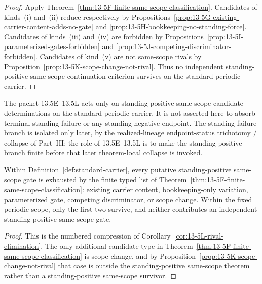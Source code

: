\begin{proof}
Apply Theorem~\ref{thm:13-5F-finite-same-scope-classification}. Candidates of kinds~(i) and~(ii)
reduce respectively by Propositions~\ref{prop:13-5G-existing-carrier-content-adds-no-gate} and
\ref{prop:13-5H-bookkeeping-no-standing-force}. Candidates of kinds~(iii) and~(iv) are forbidden by
Propositions~\ref{prop:13-5I-parameterized-gates-forbidden} and
\ref{prop:13-5J-competing-discriminator-forbidden}. Candidates of kind~(v) are not same-scope rivals
by Proposition~\ref{prop:13-5K-scope-change-not-rival}. Thus no independent standing-positive same-scope continuation
criterion survives on the standard periodic carrier.
\end{proof}

\begin{remark}\label{rem:13-5F-two-branch-posture}
The packet 13.5E--13.5L acts only on standing-positive same-scope candidate determinations on the standard periodic carrier. It is not asserted here to absorb terminal standing failure or any standing-negative endpoint. The standing-failure branch is isolated only later, by the realized-lineage endpoint-status trichotomy / collapse of Part~III; the role of 13.5E--13.5L is to make the standing-positive branch finite before that later theorem-local collapse is invoked.
\end{remark}

\begin{proposition}\label{prop:residual-gate-exhaustion}
Within Definition~\ref{def:standard-carrier}, every putative standing-positive same-scope gate is exhausted by the
finite typed list of Theorem~\ref{thm:13-5F-finite-same-scope-classification}: existing carrier
content, bookkeeping-only variation, parameterized gate, competing discriminator, or scope change.
Within the fixed periodic scope, only the first two survive, and neither contributes an independent
standing-positive same-scope gate.
\end{proposition}

\begin{proof}
This is the numbered compression of Corollary~\ref{cor:13-5L-rival-elimination}. The only additional
candidate type in Theorem~\ref{thm:13-5F-finite-same-scope-classification} is scope change, and by
Proposition~\ref{prop:13-5K-scope-change-not-rival} that case is outside the standing-positive same-scope theorem
rather than a standing-positive same-scope survivor.
\end{proof}


